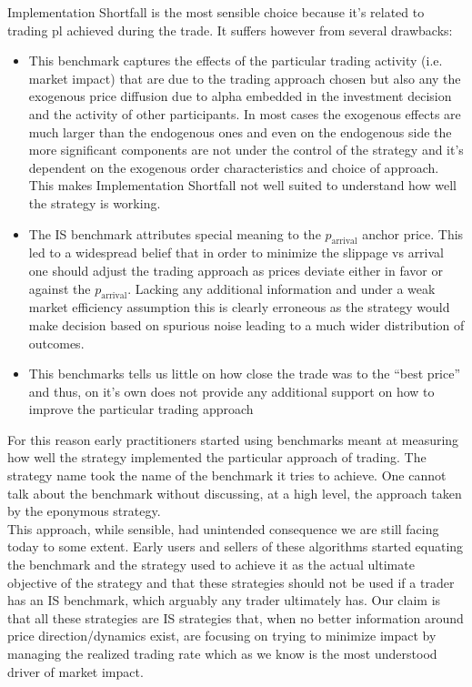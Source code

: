 Implementation Shortfall is the most sensible choice because it's related to trading pl achieved during the trade.  It suffers however from several drawbacks:
\begin{itemize}
\item This benchmark captures the effects of the particular trading activity (i.e. market impact) that are due to the trading approach chosen but also any the exogenous price diffusion due to alpha embedded in the investment decision and the activity of other participants. In most cases the exogenous effects are much larger than the endogenous ones and even on the endogenous side the more significant components are not under the control of the strategy and it's dependent on the exogenous order characteristics and choice of approach. This makes Implementation Shortfall not well suited to understand how well the strategy is working.
\item The IS benchmark attributes special meaning to the $p_{\text{arrival}}$ anchor price. This led to a widespread belief that in order to minimize the slippage vs arrival one should adjust the trading approach as prices deviate either in favor or against the   $p_{\text{arrival}}$. Lacking any additional information and under a weak market efficiency assumption this is clearly erroneous as the strategy would make decision based on spurious noise leading to a much wider distribution of outcomes.
\item This benchmarks tells us little on how close the trade was to the ``best price'' and thus, on it's own does not provide any additional support on how to improve the particular trading approach
\end{itemize}

For this reason early practitioners started using benchmarks meant at measuring how well the strategy implemented the particular approach of trading. The strategy name took the name of the benchmark it tries to achieve. One cannot talk about the benchmark without discussing, at a high level, the approach taken by the  eponymous strategy. \\

This approach, while sensible, had unintended consequence we are still facing today to some extent. Early users and sellers of these algorithms started equating the benchmark and the strategy used to achieve it as the actual ultimate objective of the strategy and that these strategies should not be used if a trader has an IS benchmark, which arguably any trader ultimately has. Our claim is that all these strategies are IS strategies that, when no better information around price direction/dynamics exist, are focusing on trying to minimize impact by managing the realized trading rate which as we know is the most understood driver of market impact.

